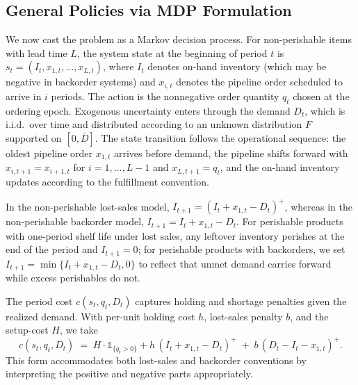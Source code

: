 \documentclass[mnsc,nonblindrev]{informs3_hide}
\begin{document}
\begin{APPENDICES}
\subsection{General Policies via MDP Formulation}
We now cast the problem as a Markov decision process. For non-perishable items with lead time $L$, the system state at the beginning of period $t$ is $s_t = (I_t, x_{1,t}, \ldots, x_{L,t})$, where $I_t$ denotes on-hand inventory (which may be negative in backorder systems) and $x_{i,t}$ denotes the pipeline order scheduled to arrive in $i$ periods. The action is the nonnegative order quantity $q_t$ chosen at the ordering epoch. Exogenous uncertainty enters through the demand $D_t$, which is i.i.d.\ over time and distributed according to an unknown distribution $F$ supported on $[0, \bar{D}]$. The state transition follows the operational sequence: the oldest pipeline order $x_{1,t}$ arrives before demand, the pipeline shifts forward with $x_{i,t+1} = x_{i+1,t}$ for $i = 1, \ldots, L-1$ and $x_{L,t+1} = q_t$, and the on-hand inventory updates according to the fulfillment convention. 

In the non-perishable lost-sales model, $I_{t+1} = (I_t + x_{1,t} - D_t)^+$, whereas in the non-perishable backorder model, $I_{t+1} = I_t + x_{1,t} - D_t$. For perishable products with one-period shelf life under lost sales, any leftover inventory perishes at the end of the period and $I_{t+1} = 0$; for perishable products with backorders, we set $I_{t+1} = \min\{I_t + x_{1,t} - D_t, 0\}$ to reflect that unmet demand carries forward while excess perishables do not.

The period cost $c(s_t, q_t, D_t)$ captures holding and shortage penalties given the realized demand. With per-unit holding cost $h$, lost-sales penalty $b$, and the setup-cost $H$, we take
\[
c(s_t, q_t, D_t) \;=\; H\cdot \mathds{1}_{\{q_t>0\}} + h \, (I_t + x_{1,t} - D_t)^+ \;+\; b \, (D_t - I_t - x_{1,t})^+.
\]
This form accommodates both lost-sales and backorder conventions by interpreting the positive and negative parts appropriately.


\end{APPENDICES}
\end{document}
